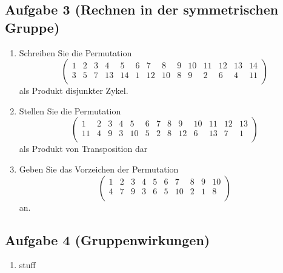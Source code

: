 \documentclass[11pt,a4paper,ngerman]{article}
\begin{document}
\subsection*{Aufgabe 3 \mdseries (Rechnen in der symmetrischen Gruppe)}

\begin{enumerate}[\bfseries a)]
\item Schreiben Sie die Permutation
$$
\left( \begin{array}{cccccccccccccc}
1 & 2 & 3 & 4 & 5 & 6 & 7 & 8 & 9 & 10 & 11 & 12 & 13 & 14  \\
3 & 5 & 7 & 13 & 14 & 1 & 12 & 10 & 8 & 9 & 2 & 6 & 4 & 11  \\
\end{array} \right)
$$
als Produkt disjunkter Zykel.

\item Stellen Sie die Permutation
$$
\left( \begin{array}{cccccccccccccc}
1 & 2 & 3 & 4 & 5 & 6 & 7 & 8 & 9 & 10 & 11 & 12 & 13  \\
11 & 4 & 9 & 3 & 10 & 5 & 2 & 8 & 12 & 6 & 13 & 7 & 1  \\
\end{array} \right)
$$
als Produkt von Transposition dar

\item Geben Sie das Vorzeichen der Permutation 
$$
\left( \begin{array}{cccccccccccccc}
1 & 2 & 3 & 4 & 5 & 6 & 7 & 8 & 9 & 10  \\
4 & 7 & 9 & 3 & 6 & 5 & 10 & 2 & 1 & 8  \\
\end{array} \right)
$$
an.

\end{enumerate}

\subsection*{Aufgabe 4 \mdseries (Gruppenwirkungen)}

\begin{enumerate}[\bfseries a)]
\item stuff
\end{enumerate}

\label{LastPage}
\end{document}
